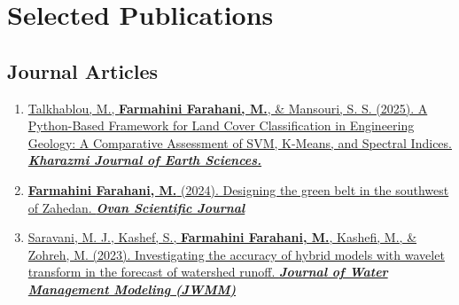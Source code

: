 \documentclass[letterpaper,11pt]{article}
\begin{document}
	\section{Selected Publications}
	\begin{justify}
			\vspace{-0.8em}
		\subsection*{Journal Articles}
		\begin{enumerate}[label=\arabic*.,left=0pt,topsep=7.5pt,partopsep=0pt,itemsep=3.5pt,parsep=0pt]
			\item \href{https://www.researchgate.net/publication/396213857_A_python-based_framework_for_land_cover_classification_in_engineering_geology_A_comparative_assessment_of_SVM_K-means_and_spectral_indices}{Talkhablou, M., \textbf{Farmahini Farahani, M.}, \& Mansouri, S. S. (2025). A Python-Based Framework for Land Cover Classification in Engineering Geology: A Comparative Assessment of SVM, K-Means, and Spectral Indices. \textit{\textbf{Kharazmi Journal of Earth Sciences.}}}
			\item \href{https://www.researchgate.net/publication/381197940_Designing_the_Green_Belt_in_the_southwest_of_Zahedan}{\textbf{Farmahini Farahani, M.} (2024). Designing the green belt in the southwest of Zahedan. \textit{\textbf{Ovan Scientific Journal}}}
			\item \href{https://www.researchgate.net/publication/371328175_Investigating_the_Accuracy_of_Hybrid_Models_with_Wavelet_Transform_in_the_Forecast_of_Watershed_Runoff}{Saravani, M. J., Kashef, S., \textbf{Farmahini Farahani, M.}, Kashefi, M., \& Zohreh, M. (2023). Investigating the accuracy of hybrid models with wavelet transform in the forecast of watershed runoff. \textit{\textbf{Journal of Water Management Modeling (JWMM)}}}
		\end{enumerate}
					\vspace{-0.6em}

\end{justify}
\end{document}
